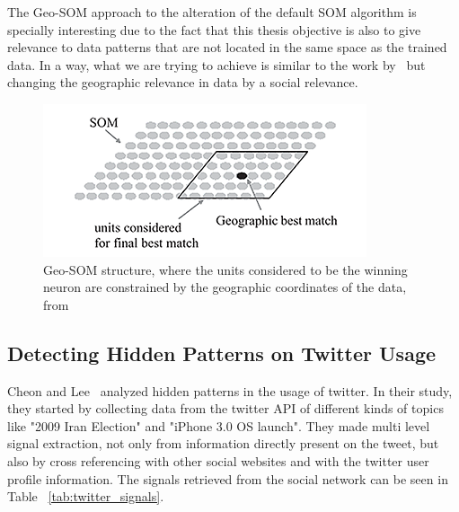 The Geo-SOM approach to the alteration of the default \ac{SOM} algorithm is specially interesting due to the fact that this thesis objective is also to give relevance to data patterns that are not located in the same space as the trained data. In a way, what we are trying to achieve is similar to the work by~\citet{Bacao2005} but changing the geographic relevance in data by a social relevance.
\begin{figure}[tb]
  \begin{center}
    \includegraphics[]{images/6_geo-som.png}
  \end{center}
  \caption{Geo-SOM structure, where the units considered to be the winning neuron are constrained by the geographic coordinates of the data, from~\citet{Bacao2005}}
  \label{fig:geo_som}
\end{figure}

\subsection{Detecting Hidden Patterns on Twitter Usage} 
\label{sub:detecting_hidden_patterns_on_twitter_usage}
Cheon and Lee~\citep{Cheong2010} analyzed hidden patterns in the usage of twitter. In their study, they started by collecting data from the twitter API of different kinds of topics like "2009 Iran Election" and "iPhone 3.0 OS launch". They made multi level signal extraction, not only from information directly present on the tweet, but also by cross referencing with other social websites and with the twitter user profile information. The signals retrieved from the social network can be seen in Table ~\ref{tab:twitter_signals}.

